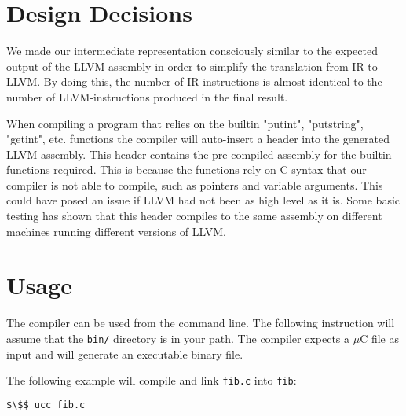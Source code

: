 
\section{Design Decisions}

We made our intermediate representation consciously similar to the expected output of the LLVM-assembly in order to simplify the translation from IR to LLVM. By doing this, the number of IR-instructions is almost identical to the number of LLVM-instructions produced in the final result.

When compiling a program that relies on the builtin "putint", "putstring", "getint", etc. functions the compiler will auto-insert a header into the generated LLVM-assembly. This header contains the pre-compiled assembly for the builtin functions required. This is because the functions rely on C-syntax that our compiler is not able to compile, such as pointers and variable arguments. This could have posed an issue if LLVM had not been as high level as it is. Some basic testing has shown that this header compiles to the same assembly on different machines running different versions of LLVM.



\section{Usage}

The compiler can be used from the command line. The following instruction will assume that the \texttt{bin/} directory is in your path. The compiler expects a $\mu$C file as input and will generate an executable binary file.

The following example will compile and link \texttt{fib.c} into \texttt{fib}:
\begin{lstlisting}[language=bash,numbers=none]
    $\$$ ucc fib.c
\end{lstlisting}


